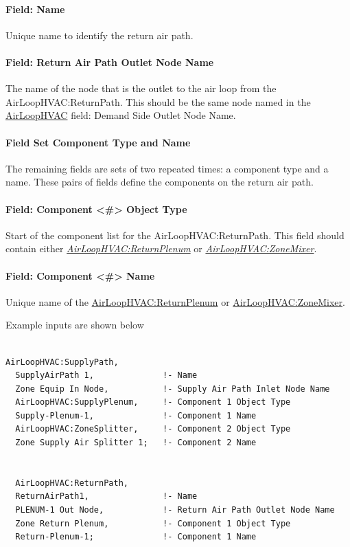 \paragraph{Field: Name}\label{field-name-1-002}

Unique name to identify the return air path.

\paragraph{Field: Return Air Path Outlet Node Name}\label{field-return-air-path-outlet-node-name}

The name of the node that is the outlet to the air loop from the AirLoopHVAC:ReturnPath. This should be the same node named in the \hyperref[airloophvac]{AirLoopHVAC} field: Demand Side Outlet Node Name.

\paragraph{Field Set Component Type and Name}\label{field-set-component-type-and-name-1}

The remaining fields are sets of two repeated times: a component type and a name. These pairs of fields define the components on the return air path.

\paragraph{Field: Component \textless{}\#\textgreater{} Object Type}\label{field-component-object-type-1}

Start of the component list for the AirLoopHVAC:ReturnPath. This field should contain either \emph{\hyperref[airloophvacreturnplenum]{AirLoopHVAC:ReturnPlenum}} or \emph{\hyperref[airloophvaczonemixer]{AirLoopHVAC:ZoneMixer}}.

\paragraph{Field: Component \textless{}\#\textgreater{} Name}\label{field-component-name-1}

Unique name of the \hyperref[airloophvacreturnplenum]{AirLoopHVAC:ReturnPlenum} or \hyperref[airloophvaczonemixer]{AirLoopHVAC:ZoneMixer}.

Example inputs are shown below

\begin{lstlisting}

AirLoopHVAC:SupplyPath,
  SupplyAirPath 1,              !- Name
  Zone Equip In Node,           !- Supply Air Path Inlet Node Name
  AirLoopHVAC:SupplyPlenum,     !- Component 1 Object Type
  Supply-Plenum-1,              !- Component 1 Name
  AirLoopHVAC:ZoneSplitter,     !- Component 2 Object Type
  Zone Supply Air Splitter 1;   !- Component 2 Name


  AirLoopHVAC:ReturnPath,
  ReturnAirPath1,               !- Name
  PLENUM-1 Out Node,            !- Return Air Path Outlet Node Name
  Zone Return Plenum,           !- Component 1 Object Type
  Return-Plenum-1;              !- Component 1 Name
\end{lstlisting}

